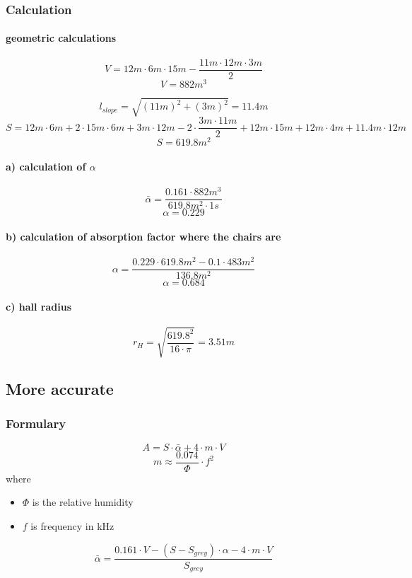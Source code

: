 \documentclass{article}
\begin{document}
			\subsubsection{Calculation}
			\paragraph{geometric calculations}
			$$V=12m\cdot 6m\cdot 15m - \frac{11m\cdot 12m\cdot 3m}{2}$$
			$$V=882m^3$$

			$$l_{slope}=\sqrt{(11m)^2+(3m)^2}=11.4m$$
			$$S=12m\cdot 6m+2\cdot 15m\cdot 6m+3m\cdot 12m-2\cdot\frac{3m\cdot 11m}{2}+12m\cdot 15m+12m\cdot 4m+11.4m\cdot 12m$$
			$$S=619.8m^2$$


			\paragraph{a) calculation of $\alpha$}
			$$\bar{\alpha}=\frac{0.161\cdot 882m^3}{619.8m^2\cdot 1s}$$
			$$\alpha=0.229$$
			
			\paragraph{b) calculation of absorption factor where the chairs are}
				$$\alpha=\frac{0.229\cdot 619.8m^2-0.1\cdot 483m^2}{136.8m^2}$$
				$$\alpha=0.684$$
			\paragraph{c) hall radius}
				$$r_H=\sqrt{\frac{619.8^2}{16\cdot\pi}}=3.51m$$
		\subsection{More accurate}
			\subsubsection{Formulary}
				\begin{equation}
					A=S\cdot\bar{\alpha}+4\cdot m\cdot V
				\end{equation}
				\begin{equation}
					m\approx\frac{0.074}{\Phi}\cdot f^2
				\end{equation}
				where 
				\begin{itemize}
					\item $\Phi$ is the relative humidity
					\item $f$ is frequency in kHz
				\end{itemize}
				\begin{equation}
					\bar{\alpha}=\frac{0.161\cdot V-(S-S_{grey})\cdot\alpha-4\cdot m\cdot V}{S_{grey}}
				\end{equation}
\end{document}
